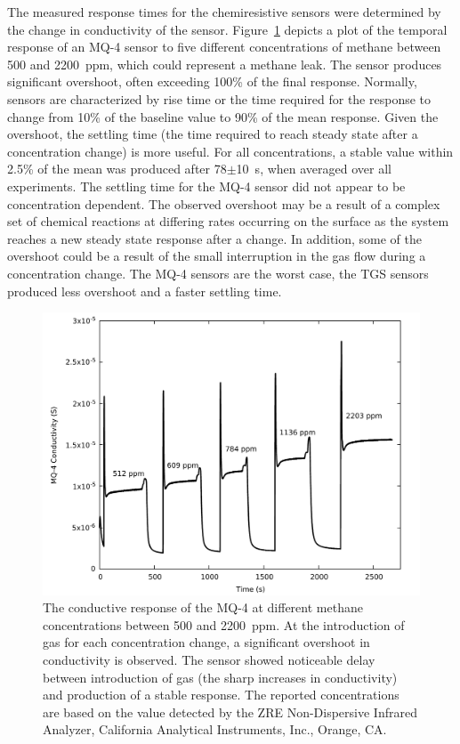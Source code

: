 \documentclass[times]{joehreview}
\begin{document}
	The measured response times for the chemiresistive sensors were determined by the change in conductivity of the sensor.  Figure~\ref{fig:mq4step} depicts a plot of the temporal response of an MQ-4 sensor to five different concentrations of methane between 500 and 2200~ppm, which could represent a methane leak. The sensor produces significant overshoot, often exceeding 100\% of the final response.  Normally, sensors are characterized by rise time or the time required for the response to change from 10\% of the baseline value to 90\% of the mean response.  Given the overshoot, the settling time (the time required to reach steady state after a concentration change) is more useful.  For all concentrations, a stable value within 2.5\% of the mean was produced after 78$\pm$\SI{10}{\second}, when averaged over all experiments.  The settling time for the MQ-4 sensor did not appear to be concentration dependent.  The observed overshoot may be a result of a complex set of chemical reactions at differing rates occurring on the surface as the system reaches a new steady state response after a change.  In addition, some of the overshoot could be a result of the small interruption in the gas flow during a concentration change. The MQ-4 sensors are the worst case, the TGS sensors produced less overshoot and a faster settling time.
	
	\begin{figure}[!t]
		\centering
		\includegraphics[width=\columnwidth]{honey6.pdf}
		\caption{The conductive response of the MQ-4 at different methane concentrations between 500 and 2200~ppm.  At the introduction of gas for each concentration change, a significant overshoot in conductivity is observed. The sensor showed noticeable delay between introduction of gas (the sharp increases in conductivity) and production of a stable response.  The reported concentrations are based on the value detected by the ZRE Non-Dispersive Infrared Analyzer, California Analytical Instruments, Inc., Orange, CA.}
		\label{fig:mq4step}
	\end{figure}
	
\end{document}
